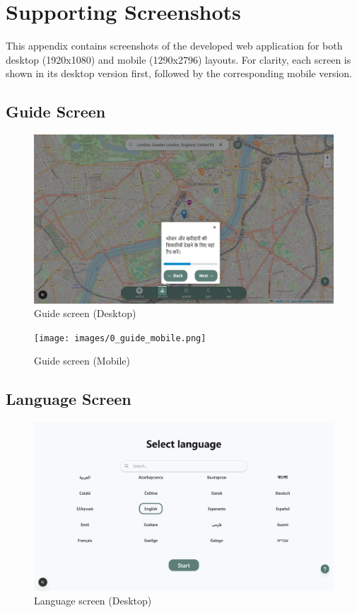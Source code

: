 \chapter{Supporting Screenshots}

This appendix contains screenshots of the developed web application for both
desktop (1920x1080) and mobile (1290x2796) layouts. For clarity, each screen
is shown in its desktop version first, followed by the corresponding mobile version.

\section{Guide Screen}
\begin{figure}[H]
    \centering
    \includegraphics[height=0.2\textheight,keepaspectratio]{images/0_guide_desktop.png}
    \caption{Guide screen (Desktop)}
\end{figure}

\begin{figure}[H]
    \centering
    \texttt{[image: images/0\_guide\_mobile.png]}
    \caption{Guide screen (Mobile)}
\end{figure}

\section{Language Screen}
\begin{figure}[H]
    \centering
    \includegraphics[height=0.3\textheight,keepaspectratio]{images/1_language_desktop.png}
    \caption{Language screen (Desktop)}
\end{figure}

